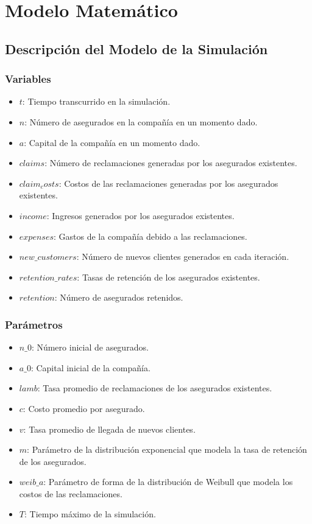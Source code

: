 \documentclass{article}
\begin{document}
\section{Modelo Matemático}
\subsection{Descripción del Modelo de la Simulación}

\subsubsection{Variables}
\begin{itemize}
    \item $t$: Tiempo transcurrido en la simulación.
    \item $n$: Número de asegurados en la compañía en un momento dado.
    \item $a$: Capital de la compañía en un momento dado.
    \item $claims$: Número de reclamaciones generadas por los asegurados existentes.
    \item $claim_costs$: Costos de las reclamaciones generadas por los asegurados existentes.
    \item  $income$: Ingresos generados por los asegurados existentes.
    \item $expenses$: Gastos de la compañía debido a las reclamaciones.
    \item $new\_customers$: Número de nuevos clientes generados en cada iteración.
    \item $retention\_rates$: Tasas de retención de los asegurados existentes.
    \item $retention$: Número de asegurados retenidos.
\end{itemize}

\subsubsection{Parámetros}
\begin{itemize}
    \item $n\_0$: Número inicial de asegurados.
    \item $a\_0$: Capital inicial de la compañía.
    \item $lamb$: Tasa promedio de reclamaciones de los asegurados existentes.
    \item $c$: Costo promedio por asegurado.
    \item $v$: Tasa promedio de llegada de nuevos clientes.
    \item $m$: Parámetro de la distribución exponencial que modela la tasa de retención de los asegurados.
    \item $weib\_a$: Parámetro de forma de la distribución de Weibull que modela los costos de las reclamaciones.
    \item $T$: Tiempo máximo de la simulación.
\end{itemize}
\end{document}
